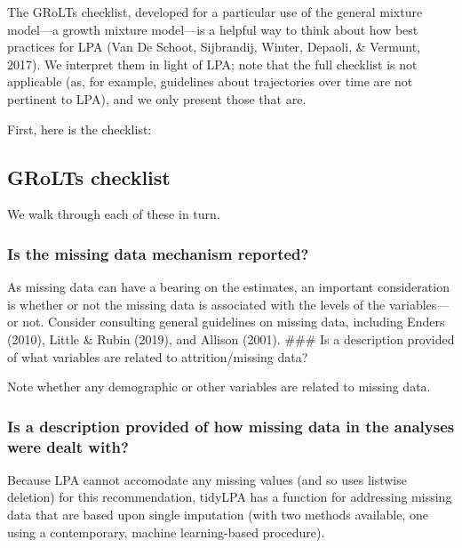 \documentclass[man]{apa6}
\begin{document}
The GRoLTs checklist, developed for a particular use of the general mixture
model---a growth mixture model---is a helpful way to think about how best
practices for LPA (Van De Schoot, Sijbrandij, Winter, Depaoli, \& Vermunt, 2017). We interpret them in light of LPA; note that
the full checklist is not applicable (as, for example, guidelines about
trajectories over time are not pertinent to LPA), and we only present those that
are.

First, here is the checklist:

\hypertarget{grolts-checklist}{%
\subsection{GRoLTs checklist}\label{grolts-checklist}}

\hypertarget{htmlwidget-fffc7926638efd89a6a8}{}

We walk through each of these in turn.

\hypertarget{is-the-missing-data-mechanism-reported}{%
\subsubsection{Is the missing data mechanism reported?}\label{is-the-missing-data-mechanism-reported}}

As missing data can have a bearing on the estimates, an important consideration is whether or not the missing data is associated with the levels of the variables---or not. Consider consulting general guidelines on missing data, including Enders (2010), Little \& Rubin (2019), and Allison (2001).
\#\#\# Is a description provided of what variables are related to attrition/missing data?

Note whether any demographic or other variables are related to missing data.

\hypertarget{is-a-description-provided-of-how-missing-data-in-the-analyses-were-dealt-with}{%
\subsubsection{Is a description provided of how missing data in the analyses were dealt with?}\label{is-a-description-provided-of-how-missing-data-in-the-analyses-were-dealt-with}}

Because LPA cannot accomodate any missing values (and so uses listwise deletion) for this recommendation, tidyLPA has a function for addressing missing data that are based upon single imputation (with two methods available, one using a contemporary, machine learning-based procedure).
\end{document}
